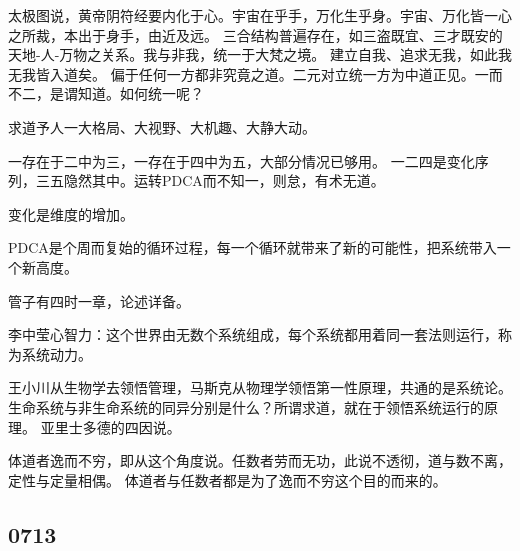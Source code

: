 太极图说，黄帝阴符经要内化于心。宇宙在乎手，万化生乎身。宇宙、万化皆一心之所裁，本出于身手，由近及远。
三合结构普遍存在，如三盗既宜、三才既安的天地-人-万物之关系。我与非我，统一于大梵之境。
建立自我、追求无我，如此我无我皆入道矣。
偏于任何一方都非究竟之道。二元对立统一方为中道正见。一而不二，是谓知道。如何统一呢？

求道予人一大格局、大视野、大机趣、大静大动。

一存在于二中为三，一存在于四中为五，大部分情况已够用。
一二四是变化序列，三五隐然其中。运转PDCA而不知一，则怠，有术无道。

变化是维度的增加。

PDCA是个周而复始的循环过程，每一个循环就带来了新的可能性，把系统带入一个新高度。

管子有四时一章，论述详备。

李中莹心智力：这个世界由无数个系统组成，每个系统都用着同一套法则运行，称为系统动力。

王小川从生物学去领悟管理，马斯克从物理学领悟第一性原理，共通的是系统论。
生命系统与非生命系统的同异分别是什么？所谓求道，就在于领悟系统运行的原理。
亚里士多德的四因说。

体道者逸而不穷，即从这个角度说。任数者劳而无功，此说不透彻，道与数不离，定性与定量相偶。
体道者与任数者都是为了逸而不穷这个目的而来的。

\subsection{0713}
